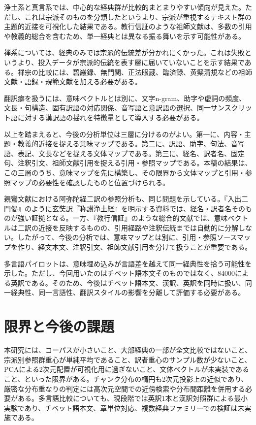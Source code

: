 \documentclass[uplatex,dvipdfmx,11pt,a4paper]{jsarticle}
\begin{document}
浄土系と真言系では、中心的な経典群が比較的まとまりやすい傾向が見えた。ただし、これは宗派そのものを分類したというより、宗派が重視するテキスト群の主題的近接を可視化した結果である。教行信証のような祖師文献は、多数の引用や教義的総合を含むため、単一経典とは異なる振る舞いを示す可能性がある。

禅系については、経典のみでは宗派的伝統差が分かれにくかった。これは失敗というより、投入データが宗派的伝統を表す層に届いていないことを示す結果である。禅宗の比較には、碧巌録、無門関、正法眼蔵、臨済録、黄檗清規などの祖師文献・語録・規範文献を加える必要がある。

翻訳癖を扱うには、意味ベクトルとは別に、文字n-gram、助字や虚詞の頻度、文長・句構造、固有訳語の対応関係、音写語と意訳語の選択、同一サンスクリット語に対する漢訳語の揺れを特徴量として導入する必要がある。

以上を踏まえると、今後の分析単位は三層に分けるのがよい。第一に、内容・主題・教義的近接を捉える意味マップである。第二に、訳語、助字、句法、音写語、表記、文長などを捉える文体マップである。第三に、経名、訳者名、固定句、注釈引文、祖師文献引用を捉える引用・参照マップである。本稿の結果は、この三層のうち、意味マップを先に構築し、その限界から文体マップと引用・参照マップの必要性を確認したものと位置づけられる。

親鸞文献における阿弥陀経二訳の参照分析も、同じ問題を示している。『入出二門偈』のように玄奘訳『称讃浄土経』を明示する資料では、経名・訳者名そのものが強い証拠となる。一方、『教行信証』のような総合的文献では、意味ベクトルは二訳の近接を反映するものの、引用経路や注釈伝統までは自動的に分解しない。したがって、今後の分析では、意味マップとは別に、引用・参照ソースマップを作り、経文本文、注釈引文、祖師文献引用を分けて扱うことが重要である。

多言語パイロットは、意味埋め込みが言語差を越えて同一経典性を拾う可能性を示した。ただし、今回用いたのはチベット語本文そのものではなく、84000による英訳である。そのため、今後はチベット語本文、漢訳、英訳を同時に扱い、同一経典性、同一言語性、翻訳スタイルの影響を分離して評価する必要がある。

\section{限界と今後の課題}

本研究には、コーパスが小さいこと、大部経典の一部が全文比較ではないこと、宗派別参照群重心が単純平均であること、訳者重心のサンプル数が少ないこと、PCAによる2次元配置が可視化用に過ぎないこと、文体ベクトルが未実装であること、といった限界がある。チャンク分布の楕円も2次元投影上の近似であり、厳密な分布重なりの判定には高次元空間での近傍検索や分布間距離を併用する必要がある。多言語比較についても、現段階では英訳1本と漢訳対照群による最小実験であり、チベット語本文、章単位対応、複数経典ファミリーでの検証は未実施である。
\end{document}
